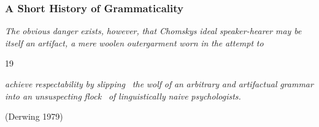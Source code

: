 \subsubsection[A Short History of Grammaticality]{A Short History of Grammaticality}
\begin{styleStandard}
\textit{The}\textit{ }\textit{obvious}\textit{ }\textit{danger}\textit{ }\textit{exists,}\textit{ }\textit{however,}\textit{ }\textit{that Chomsky{\textquotesingle}s}\textit{ }\textit{{\textquotedbl}ideal}\textit{ }\textit{speaker-hearer{\textquotedbl}}\textit{ }\textit{may be}\textit{ }\textit{itself}\textit{ }\textit{an}\textit{ }\textit{artifact, a}\textit{ }\textit{mere}\textit{ }\textit{woolen}\textit{ }\textit{outergarment}\textit{ }\textit{worn}\textit{ }\textit{in}\textit{ }\textit{the}\textit{ }\textit{attempt}\textit{ }\textit{to}
\end{styleStandard}


\begin{styleStandard}
19
\end{styleStandard}


\clearpage\setcounter{page}{1}\begin{styleStandard}
\textit{achieve}\textit{ }\textit{respectability}\textit{ }\textit{by}\textit{ }\textit{slipping }\textit{\ }\textit{the}\textit{ }\textit{wolf}\textit{ }\textit{of}\textit{ }\textit{an}\textit{ }\textit{arbitrary}\textit{ }\textit{and}\textit{ }\textit{artifactual}\textit{ }\textit{grammar}\textit{ }\textit{into an}\textit{ }\textit{unsuspecting}\textit{ }\textit{flock }\textit{\ }\textit{of}\textit{ }\textit{linguistically}\textit{ }\textit{naive}\textit{ }\textit{psychologists.}
\end{styleStandard}


\begin{styleStandard}
(Derwing 1979)
\end{styleStandard}


